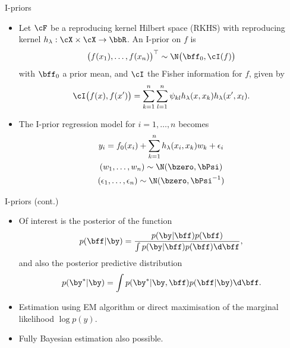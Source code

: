 \begin{frame}{I-priors}
  \vspace{-16pt}
  \begin{itemize}\setlength\itemsep{1em}
    \item Let $\cF$ be a reproducing kernel Hilbert space (RKHS) with reproducing kernel $h_\lambda: \cX \times \cX \rightarrow \bbR$. An I-prior on $f$ is
    \[
      \big(f(x_1), \dots, f(x_n)\big)^\top \sim \N\big(\bff_0, \cI(f)\big)
    \] 
    with $\bff_0$ a prior mean, and $\cI$ the Fisher information for $f$, given by
    \[
      \cI\big(f(x), f(x')\big) = \sum_{k=1}^n\sum_{l=1}^n \psi_{kl} h_\lambda(x,x_k) h_\lambda(x',x_l).
    \]
    \item The I-prior regression model for $i = 1,\dots,n$ becomes
    \begin{align*}
      \begin{gathered}
        y_i = f_0(x_i) + \sum_{k=1}^n h_\lambda(x_i, x_k)w_k + \epsilon_i \\
        (w_1, \dots, w_n) \sim \N(\bzero, \bPsi) \\
        (\epsilon_1, \dots, \epsilon_n) \sim \N(\bzero, \bPsi^{-1})
      \end{gathered}    
    \end{align*}
  \end{itemize}
\end{frame}

\begin{frame}{I-priors (cont.)}
  \begin{itemize}
    \item Of interest is the posterior of the function
    \[
      p(\bff | \by ) = \frac{p(\by | \bff) p(\bff)}{\int p(\by | \bff) p(\bff) \d\bff},
    \]
    and also the posterior predictive distribution
    \[
      p(\by^* | \by ) = \int p(\by^* | \by, \bff ) p(\bff | \by ) \d\bff.
    \]
    \item Estimation using EM algorithm or direct maximisation of the marginal likelihood $\log p(y)$.
    \item Fully Bayesian estimation also possible.
  \end{itemize}
\end{frame}


